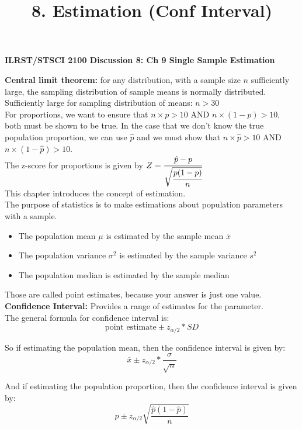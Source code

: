 \documentclass[12pt]{article}
\begin{document}
\title{8. Estimation (Conf Interval)}
\begin{center} \textbf{ILRST/STSCI 2100 Discussion 8: Ch 9 Single Sample Estimation }
\end{center}
\noindent \textbf{Central limit theorem:} for any distribution, with a sample size $n$ sufficiently large, the sampling distribution of sample means is normally distributed.\\

\noindent Sufficiently large for sampling distribution of means: $n > 30$\\

\noindent For proportions, we want to ensure that $n \times p >10$ AND $n \times (1-p) > 10$, both must be shown to be true. In the case that we don't know the true population proportion, we can use $\hat{p}$ and we must show that $n \times \hat{p}>10$ AND $n \times (1-\hat{p})>10$. \\
\noindent The z-score for proportions is given by $Z=\cfrac{\hat{p}-p}{\sqrt{\cfrac{p(1-p)}{n}}}$ \\  
\bigbreak
\noindent This chapter introduces the concept of estimation. \\
The purpose of statistics is to make estimations about population parameters with a sample.
\begin{itemize}
\item The population mean $\mu$ is estimated by the sample mean $\bar{x}$
\item The population variance $\sigma^{2}$ is estimated by the sample variance $s^{2}$
\item The population median is estimated by the sample median
\end{itemize}
Those are called point estimates, because your answer is just one value.\\ 

\noindent \textbf{Confidence Interval:} Provides a range of estimates for the parameter.\\

The general formula for confidence interval is:\\
$$\text{point estimate} \pm z_{\alpha/2}*SD $$

So if estimating the population mean, then the confidence interval is given by: \\
$$\bar{x} \pm z_{\alpha/2}*\frac{\sigma}{\sqrt{n}}$$

And if estimating the population proportion, then the confidence interval is given by:\\
$$\hat{p} \pm z_{\alpha/2}\sqrt{\frac{\hat{p}(1-\hat{p})}{n}}$$
\end{document}
